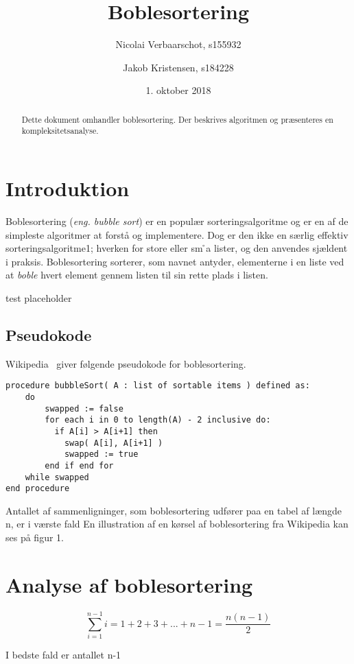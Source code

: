 \documentclass{article}
\title{Boblesortering}
\author{Nicolai Verbaarschot, s155932 \and Jakob Kristensen, s184228}
\date{1. oktober 2018}
\begin{document}
\maketitle
\begin{abstract}
    Dette dokument omhandler boblesortering. Der beskrives algoritmen og præsenteres en kompleksitetsanalyse.
\end{abstract}

\section{Introduktion}
Boblesortering (\textit{eng. bubble sort}) er en populær sorteringsalgoritme og er en af de simpleste algoritmer at forstå og implementere. Dog er den ikke en særlig effektiv sorteringsalgoritme1; hverken for store eller sm ̊a lister, og den anvendes sjældent i praksis. Boblesortering sorterer, som navnet antyder, elementerne i en liste ved at \textit{boble} hvert element gennem listen til sin rette plads i listen.

test placeholder

\subsection{Pseudokode}
Wikipedia~\cite{wiki} giver følgende pseudokode for boblesortering.

\begin{verbatim}
procedure bubbleSort( A : list of sortable items ) defined as:
    do
        swapped := false
        for each i in 0 to length(A) - 2 inclusive do:
          if A[i] > A[i+1] then
            swap( A[i], A[i+1] )
            swapped := true
        end if end for
    while swapped
end procedure
\end{verbatim}

Antallet af sammenligninger, som boblesortering udfører paa en tabel af længde n, er i værste fald
En illustration af en kørsel af boblesortering fra Wikipedia kan ses på figur 1.

\section{Analyse af boblesortering}


\begin{equation}
\sum_{i=1}^{n-1} i=1+2+3+...+n-1=\frac{n(n-1)}{2}
\label{eq:sn}
\end{equation}

I bedste fald er antallet n-1
\end{document}
